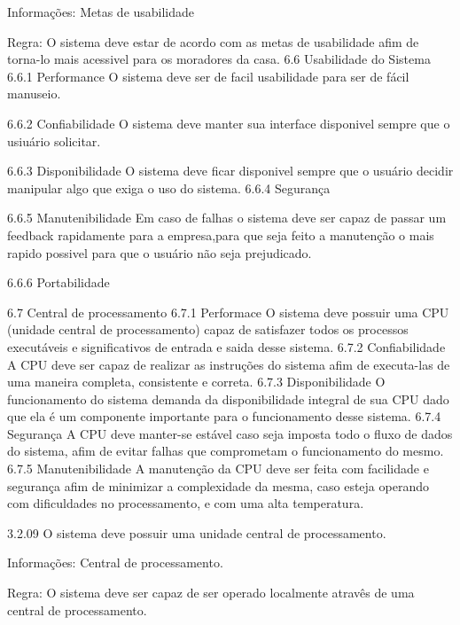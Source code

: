     Informações: Metas de usabilidade

    Regra: O sistema deve estar de acordo com as metas de usabilidade afim de torna-lo mais acessivel para os moradores da casa.
6.6 Usabilidade do Sistema
6.6.1 Performance 
    O sistema deve ser de facil usabilidade para ser de fácil manuseio.
    
6.6.2 Confiabilidade
O sistema deve manter sua interface disponivel sempre que o usiuário solicitar.

6.6.3 Disponibilidade
    O sistema deve ficar disponivel sempre que o usuário decidir manipular algo que exiga o uso do sistema.
6.6.4 Segurança
    
6.6.5 Manutenibilidade
    Em caso de falhas o sistema deve ser capaz de passar um feedback rapidamente para a empresa,para que seja feito a manutenção o mais rapido possivel para que o usuário não seja prejudicado.
    
6.6.6 Portabilidade
    





6.7 Central de processamento
6.7.1 Performace
    O sistema deve possuir uma CPU (unidade central de processamento) capaz de satisfazer todos os processos executáveis e significativos de entrada e saida desse sistema.
6.7.2 Confiabilidade
    A CPU deve ser capaz de realizar as instruções do sistema afim de executa-las de uma maneira completa, consistente e correta. 
6.7.3 Disponibilidade
    O funcionamento do sistema demanda da disponibilidade integral de sua CPU dado que ela é um componente importante para o funcionamento desse sistema.
6.7.4 Segurança
    A CPU deve manter-se estável caso seja imposta todo o fluxo de dados do sistema, afim de evitar falhas que comprometam o funcionamento do mesmo.
6.7.5 Manutenibilidade
    A manutenção da CPU deve ser feita com facilidade e segurança afim de minimizar a complexidade da mesma, caso esteja operando com dificuldades no processamento, e com uma alta temperatura.


3.2.09    O sistema deve possuir uma unidade central de processamento.
    
    Informações: Central de processamento.

    Regra: O sistema deve ser capaz de ser operado localmente atravês de uma central de processamento.

